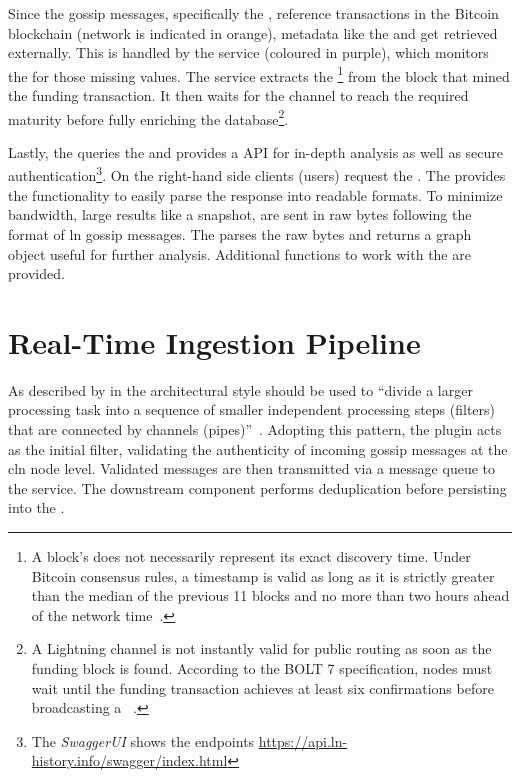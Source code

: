 Since the gossip messages, specifically the , reference transactions 
in the Bitcoin blockchain (network is indicated in orange), 
metadata like the  and  get retrieved externally. 
This is handled by the  service (coloured in purple), 
which monitors the  for those missing values.
The service extracts the \footnote{
    A block's  does not necessarily represent its exact discovery time. 
    Under Bitcoin consensus rules, a timestamp is valid as long as it is strictly greater than the median 
    of the previous 11 blocks and no more than two hours ahead of the network time~\cite{bitcoincoredevelopers_bitcoin_2026a}.
} 
from the block that mined the funding transaction. It then waits for the channel
to reach the required maturity before fully enriching the database\footnote{
    A Lightning channel is not instantly valid for public routing as soon as the funding block is found. 
    According to the BOLT 7 specification, nodes must wait until the funding transaction achieves 
    at least six confirmations before broadcasting a ~\cite{lightningdevelopers_bolts_2018}.
}.

Lastly, the  queries the  
and provides a  API for in-depth analysis as well as secure authentication\footnote{
The \textit{SwaggerUI} shows the endpoints \url{https://api.ln-history.info/swagger/index.html}}.
On the right-hand side clients (users) request the . 
The  provides the functionality to easily parse the response into readable formats.
To minimize bandwidth, large results like a snapshot, are sent in raw bytes following the format of \gls{ln} gossip messages.
The  parses the raw bytes and returns a graph object useful for further analysis.
Additional functions to work with the  are provided.



\section{Real-Time Ingestion Pipeline}
\label{sec:real-time-pipeline}

As described by \citeauthor{hohpe_enterprise_2012} in  
the  architectural style should be used to
\enquote{divide a larger processing task into a sequence of smaller independent processing steps (filters) 
that are connected by channels (pipes)}~\cite[p.~70]{hohpe_enterprise_2012}.
Adopting this pattern, the  plugin acts as the initial filter, 
validating the authenticity of incoming gossip messages at the \gls{cln} node level. 
Validated messages are then transmitted via a  message queue to the  service. 
The downstream component performs deduplication before persisting into the .

